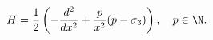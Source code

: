 \begin{equation}
H=\frac{1}{2}\left(-\frac{d^2}{dx^2}+\frac{p}
{x^2}(p- \sigma_3)\right),\quad
p\in \N.
\label{hamik}
\end{equation}


